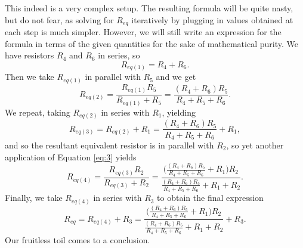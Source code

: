 \documentclass{article}
\theoremstyle{definition}
\begin{document}
This indeed is a very complex setup. The resulting formula will be quite nasty, but do not fear, as solving for $R_{eq}$ iteratively by 
plugging in values obtained at each step is much simpler. However, we will still write an expression for the formula in terms of the 
given quantities for the sake of mathematical purity. We have resistors $R_4$ and $R_6$ in series, so    
\begin{equation*}
    R_{eq(1)} = R_4+R_6.
\end{equation*}
Then we take $R_{eq(1)}$ in parallel with $R_5$ and we get 
\begin{equation*}
    R_{eq(2)} = \frac{R_{eq(1)}R_5}{R_{eq(1)}+R_5} = \frac{(R_4+R_6)R_5}{R_4 + R_5 + R_6}.
\end{equation*}
We repeat, taking $R_{eq(2)}$ in series with $R_1$, yielding
\begin{equation*}
    R_{eq(3)} = R_{eq(2)} + R_1 = \frac{(R_4+R_6)R_5}{R_4 + R_5 + R_6} + R_1, 
\end{equation*}
and so the resultant equivalent resistor is in parallel with $R_2$, so yet another application of Equation \ref{eq:3} yields
\begin{equation*}
    R_{eq(4)} = \frac{R_{eq(3)}R_2}{R_{eq(3)}+R_2} = \frac{\big(\frac{(R_4+R_6)R_5}{R_4 + R_5 + R_6} + R_1\big)R_2}{\frac{(R_4+R_6)R_5}{R_4 + R_5 + R_6} + R_1 + R_2}.
\end{equation*}
Finally, we take $R_{eq(4)}$ in series with $R_3$ to obtain the final expression
\begin{equation} \label{eq:6}
    R_{eq} = R_{eq(4)} + R_3 = \frac{\big(\frac{(R_4+R_6)R_5}{R_4 + R_5 + R_6} + R_1\big)R_2}{\frac{(R_4+R_6)R_5}{R_4 + R_5 + R_6} + R_1 + R_2} + R_3.
\end{equation}
Our fruitless toil comes to a conclusion.
\end{document}
